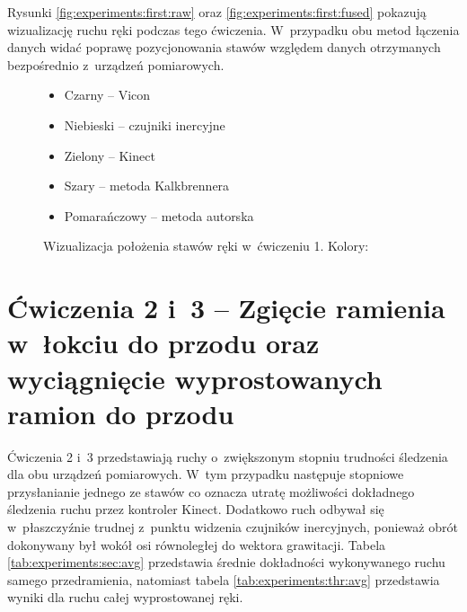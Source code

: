 Rysunki \ref{fig:experiments:first:raw} oraz \ref{fig:experiments:first:fused} pokazują wizualizację ruchu ręki podczas tego ćwiczenia. W~przypadku obu metod łączenia danych widać poprawę pozycjonowania stawów względem danych otrzymanych bezpośrednio z~urządzeń pomiarowych. 

\begin{figure}[!htb]
	\captionsetup{singlelinecheck=off}
	\centering
	\caption[Wizualizacja położenia stawów ręki w~ćwiczeniu 1]{Wizualizacja położenia stawów ręki w~ćwiczeniu 1. Kolory:}	
	\begin{itemize}
		\item Czarny -- Vicon
		\item Niebieski -- czujniki inercyjne
		\item Zielony -- Kinect
		\item Szary -- metoda Kalkbrennera
		\item Pomarańczowy -- metoda autorska
	\end{itemize}
\end{figure}

\section*{Ćwiczenia 2 i~3 -- Zgięcie ramienia w~łokciu do przodu oraz wyciągnięcie wyprostowanych ramion do przodu}
Ćwiczenia 2 i~3 przedstawiają ruchy o~zwiększonym stopniu trudności śledzenia dla obu urządzeń pomiarowych. W~tym przypadku następuje stopniowe przysłanianie jednego ze stawów co oznacza utratę możliwości dokładnego śledzenia ruchu przez kontroler Kinect. Dodatkowo ruch odbywał się w~płaszczyźnie trudnej z~punktu widzenia czujników inercyjnych, ponieważ obrót dokonywany był wokół osi równoległej do wektora grawitacji. Tabela \ref{tab:experiments:sec:avg} przedstawia średnie dokładności wykonywanego ruchu samego przedramienia, natomiast tabela \ref{tab:experiments:thr:avg} przedstawia wyniki dla ruchu całej wyprostowanej ręki.

